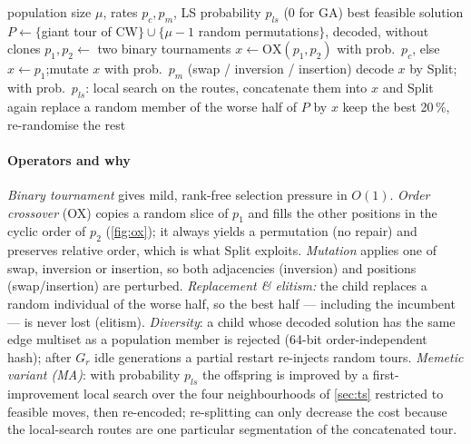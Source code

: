 \begin{algorithm}[t]
\caption{Steady-state GA (and memetic variant MA)}\label{alg:ga}
\small
\begin{algorithmic}[1]
\Require population size $\mu$, rates $p_c,p_m$, LS probability $p_{ls}$ ($0$ for GA) \Ensure best feasible solution
\State $P\gets\{$giant tour of CW$\}\cup\{\mu-1$ random permutations$\}$, decoded, without clones
   
    \State $p_1,p_2\gets$ two binary tournaments
    \State $x\gets\mathrm{OX}(p_1,p_2)$ with prob.\ $p_c$, else $x\gets p_1$;\quad mutate $x$ with prob.\ $p_m$ (swap / inversion / insertion)
    \State decode $x$ by Split; with prob.\ $p_{ls}$: local search on the routes, concatenate them into $x$ and Split again
     replace a random member of the worse half of $P$ by $x$ \EndIf
  \EndFor
   keep the best 20\,\%, re-randomise the rest \EndIf
\EndWhile
\end{algorithmic}
\end{algorithm}

\paragraph{Operators and why} \emph{Binary tournament} gives mild, rank-free selection pressure in $O(1)$.
\emph{Order crossover} (OX) \citep{davis1985applying} copies a random slice of $p_1$ and fills the other
positions in the cyclic order of $p_2$ (\cref{fig:ox}); it always yields a permutation (no repair) and
preserves relative order, which is what Split exploits. \emph{Mutation} applies one of swap, inversion
or insertion, so both adjacencies (inversion) and positions (swap/insertion) are perturbed.
\emph{Replacement \& elitism:} the child replaces a random individual of the worse half, so the best
half --- including the incumbent --- is never lost (elitism). \emph{Diversity}: a child whose decoded
solution has the same edge multiset as a population member is rejected (64-bit order-independent hash);
after $G_r$ idle generations a partial restart re-injects random tours. \emph{Memetic variant (MA)}: with
probability $p_{ls}$ the offspring is improved by a first-improvement local search over the four
neighbourhoods of \cref{sec:ts} restricted to feasible moves, then re-encoded; re-splitting can only
decrease the cost because the local-search routes are one particular segmentation of the concatenated tour.

